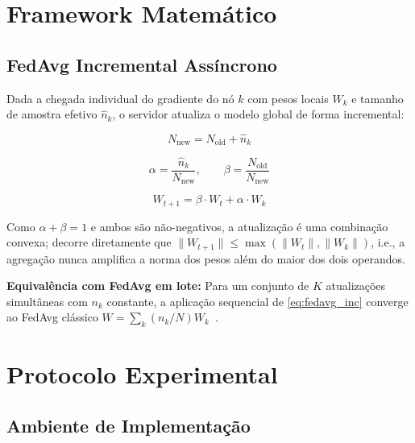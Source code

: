 \documentclass[conference,a4paper]{IEEEtran}
\begin{document}
\section{Framework Matemático}
\label{sec:math}

\subsection{FedAvg Incremental Assíncrono}

Dada a chegada individual do gradiente do nó $k$ com pesos locais $W_k$ e
tamanho de amostra efetivo $\hat{n}_k$, o servidor atualiza o modelo global de
forma incremental:

\begin{equation}
N_{\text{new}} = N_{\text{old}} + \hat{n}_k
\label{eq:new_total}
\end{equation}

\begin{equation}
\alpha = \frac{\hat{n}_k}{N_{\text{new}}}, \qquad
\beta  = \frac{N_{\text{old}}}{N_{\text{new}}}
\label{eq:alpha_beta}
\end{equation}

\begin{equation}
\boxed{W_{t+1} = \beta \cdot W_t + \alpha \cdot W_k}
\label{eq:fedavg_inc}
\end{equation}

\noindent Como $\alpha + \beta = 1$ e ambos são não-negativos, a atualização
é uma combinação convexa; decorre diretamente que
$\|W_{t+1}\| \leq \max(\|W_t\|, \|W_k\|)$, i.e., a agregação nunca amplifica
a norma dos pesos além do maior dos dois operandos.

\noindent \textbf{Equivalência com FedAvg em lote:} Para um conjunto de $K$
atualizações simultâneas com $n_k$ constante, a aplicação sequencial de
\eqref{eq:fedavg_inc} converge ao FedAvg clássico
$W = \sum_k (n_k/N) W_k$~\cite{mcmahan2017}.

\section{Protocolo Experimental}
\label{sec:exp}

\subsection{Ambiente de Implementação}
\end{document}
